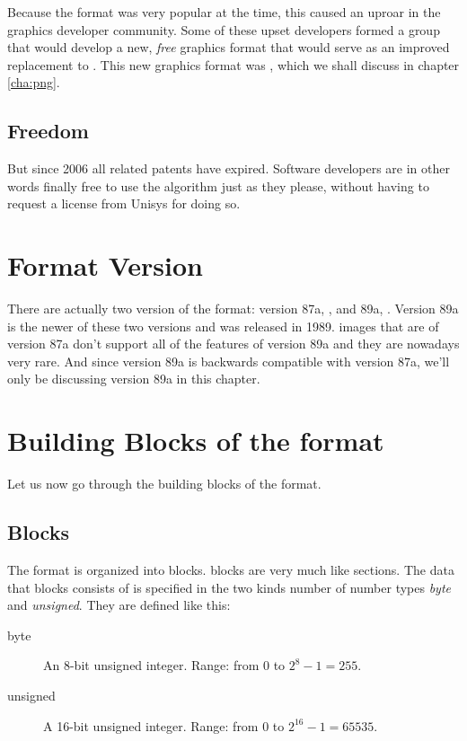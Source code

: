 Because the \gif format was very popular at the time, this caused an
uproar in the graphics developer community. Some of these upset
developers formed a group that would develop a new, \textit{free}
graphics format that would serve as an improved replacement to
\gif. This new graphics format was \png, which we shall discuss in
chapter \ref{cha:png}.

\subsection{Freedom}

But since 2006 all \lzw related patents have expired. Software
developers are in other words finally free to use the \lzw algorithm
just as they please, without having to request a license from Unisys
for doing so.

\section{Format Version}

There are actually two version of the \gif format: version 87a,
\cite{gif87a}, and 89a, \cite{gif89a}. Version 89a is the newer of
these two versions and was released in 1989. \gif images that are of
version 87a don't support all of the features of version 89a and they
are nowadays very rare. And since version 89a is backwards compatible
with version 87a, we'll only be discussing version 89a in this
chapter.

\section{Building Blocks of the format}

Let us now go through the building blocks of the \gif format.

\subsection{Blocks}

The \gif format is organized into blocks. \gif blocks are very much like
\tga sections. The data that blocks consists of is specified in the two
kinds number of number types \textit{byte} and \textit{unsigned}. They
are defined like this:

\begin{description}
\item[byte] An 8-bit unsigned integer. Range: from 0 to $2^8 - 1 = 255$.
\item[unsigned] A 16-bit unsigned integer. Range: from 0 to $2^{16} -
  1 = 65535$.
\end{description}

